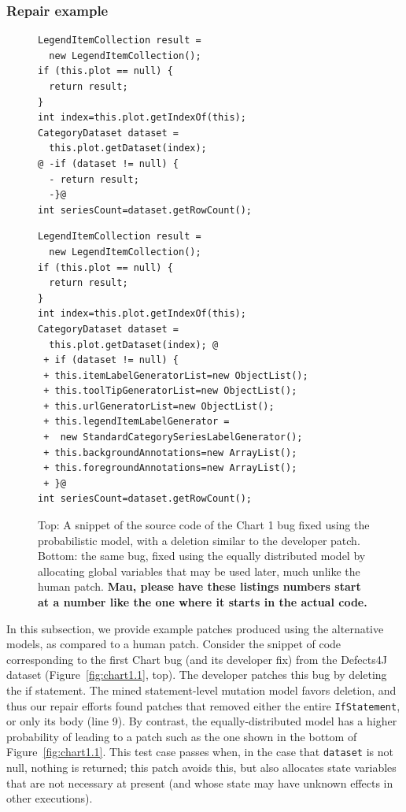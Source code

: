 \documentclass[conference]{IEEEtran}
\newcommand{\todo}[1]
  {{\scriptsize \textbf{\color{red} {#1}}}}
\begin{document}
\subsubsection{Repair example} \label{examPatches}

\begin{figure}[t]
\begin{lstlisting}[frame=single]
LegendItemCollection result = 
  new LegendItemCollection();
if (this.plot == null) {
  return result;
}
int index=this.plot.getIndexOf(this);
CategoryDataset dataset = 
  this.plot.getDataset(index);
@ -if (dataset != null) {
  - return result;
  -}@
int seriesCount=dataset.getRowCount();
	\end{lstlisting}

\begin{lstlisting}[frame=single]
LegendItemCollection result = 
  new LegendItemCollection();
if (this.plot == null) {
  return result;
}
int index=this.plot.getIndexOf(this);
CategoryDataset dataset = 
  this.plot.getDataset(index); @
 + if (dataset != null) { 
 + this.itemLabelGeneratorList=new ObjectList();
 + this.toolTipGeneratorList=new ObjectList();
 + this.urlGeneratorList=new ObjectList();
 + this.legendItemLabelGenerator = 
 +  new StandardCategorySeriesLabelGenerator();
 + this.backgroundAnnotations=new ArrayList();
 + this.foregroundAnnotations=new ArrayList();
 + }@
int seriesCount=dataset.getRowCount();
	\end{lstlisting}
	\caption{Top: A snippet of the source code of the Chart 1 bug fixed using the
      probabilistic model, with a deletion similar to the developer
      patch. Bottom: the same bug, fixed using the equally distributed
      model by 
      allocating global variables that may be used later, much unlike the human
      patch.\todo{Mau, please have these listings numbers start at a number
        like the one where it starts in the actual code.}\label{fig:chart1.3}}
\end{figure}


In this subsection, we provide example patches produced using the alternative
models, as compared to a human patch.  Consider the snippet of code corresponding
to the first Chart bug (and its developer fix) from the Defects4J dataset
(Figure~\ref{fig:chart1.1}, top).  The developer patches this bug by deleting the if
statement.  The mined statement-level mutation model favors deletion, and thus
our repair efforts found patches that removed either the entire \texttt{IfStatement}, or only its body (line 9).
By contrast, the equally-distributed model has a higher probability of leading
to a patch such as the one shown in the bottom of Figure~\ref{fig:chart1.1}.  This test case
passes when, in the case that \texttt{dataset} is not null, nothing is returned;
this patch avoids this, but also allocates state variables that are not
necessary at present (and whose state may have unknown effects in other
executions). 
\end{document}

